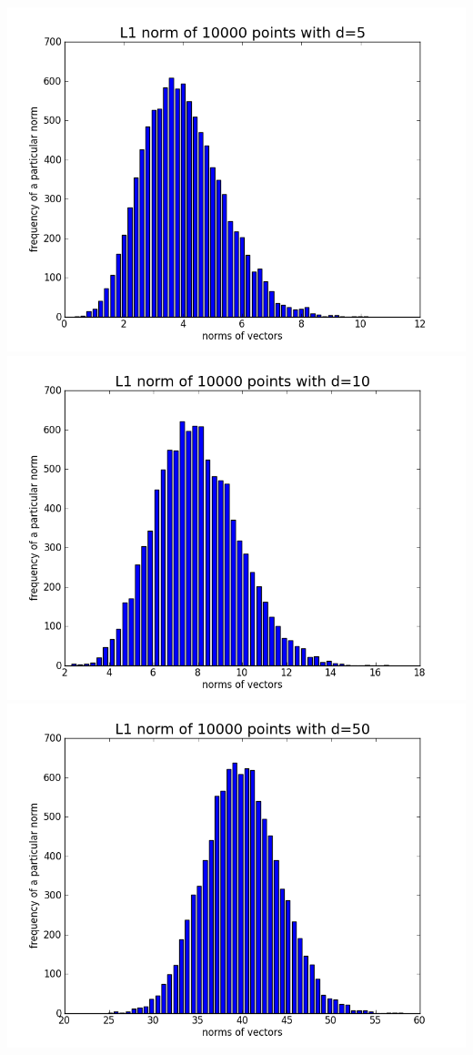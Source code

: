 \documentclass[11pt]{article}
\begin{document}
\begin{center}
\includegraphics[scale=0.25]{p1d5.png}
\includegraphics[scale=0.25]{p1d10.png}
\includegraphics[scale=0.25]{p1d50.png}
\end{center}
\end{document}
